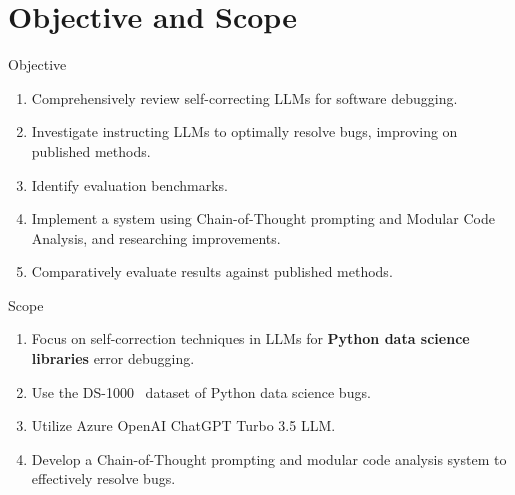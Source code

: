 \section{Objective and Scope}

\begin{frame}{Objective}
    \begin{enumerate}
        \item Comprehensively review self-correcting LLMs for software debugging.

        \item Investigate instructing LLMs to optimally resolve bugs, improving on published methods.

        \item Identify evaluation benchmarks.

        \item Implement a system using Chain-of-Thought prompting and Modular Code Analysis, and researching improvements.

        \item Comparatively evaluate results against published methods.
    \end{enumerate}
\end{frame}

\begin{frame}{Scope}
    \begin{enumerate}
        \item Focus on self-correction techniques in LLMs for \textbf{Python data science libraries} error debugging.

        \item Use the DS-1000~\cite{pmlr-v202-lai23b} dataset of Python data science bugs.

        \item Utilize Azure OpenAI ChatGPT Turbo 3.5 LLM.

        \item Develop a Chain-of-Thought prompting and modular code analysis system to effectively resolve bugs.
    \end{enumerate}
\end{frame}

